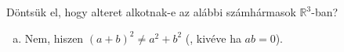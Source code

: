 \documentclass[exercise]{math-standalone}
\begin{document}
\begin{exercise}{%
    Döntsük el, hogy alteret alkotnak-e az alábbi számhármasok
    $\mathbb R^3$-ban?
  }
{\begin{enumerate}[a)]
            \tcbline
      \item Nem, hiszen $(a + b)^2 \neq a^2 + b^2$ (, kivéve ha $ab = 0$).
    \end{enumerate}
  }
\end{exercise}
\end{document}
